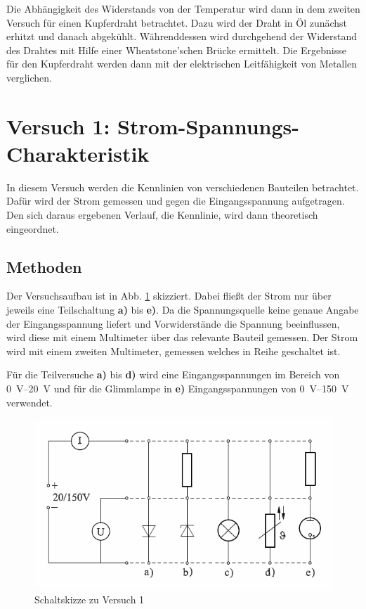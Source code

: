 \documentclass[11pt,a4paper,titlepage, ngerman]{article}
\begin{document}
		Die Abhängigkeit des Widerstands von der Temperatur wird dann in dem zweiten Versuch für einen Kupferdraht betrachtet.
		Dazu wird der Draht in Öl zunächst erhitzt und danach abgekühlt. Währenddessen wird durchgehend der Widerstand des Drahtes mit Hilfe einer Wheatstone'schen Brücke ermittelt. Die Ergebnisse für den Kupferdraht werden dann mit der elektrischen Leitfähigkeit von Metallen verglichen.

	\section{Versuch 1: Strom-Spannungs-Charakteristik}
		
		In diesem Versuch werden die Kennlinien von verschiedenen Bauteilen betrachtet. Dafür wird der Strom gemessen und gegen die Eingangsspannung aufgetragen. Den sich daraus ergebenen Verlauf, die Kennlinie, wird dann theoretisch eingeordnet. 
		
		\subsection{Methoden} 
		
		Der Versuchsaufbau ist in Abb. \ref{Schaltskizze1} skizziert. Dabei fließt der Strom nur über jeweils eine Teilschaltung \textbf{a)} bis \textbf{e)}. 
		Da die Spannungsquelle keine genaue Angabe der Eingangsspannung liefert und Vorwiderstände die Spannung beeinflussen, wird diese mit einem Multimeter über das relevante Bauteil gemessen.
		Der Strom wird mit einem zweiten Multimeter, gemessen welches in Reihe geschaltet ist.
		
		Für die Teilversuche \textbf{a)} bis \textbf{d)} wird eine Eingangsspannungen im Bereich von \SIrange{0}{20}{\V} und für die Glimmlampe in \textbf{e)} Eingangsspannungen von \SIrange{0}{150}{\V} verwendet.
		
		\begin{figure}
			\includegraphics[width=\textwidth]{Versuch1.png}
			\caption{Schaltskizze zu Versuch 1}
			\label{Schaltskizze1}
		\end{figure}
\end{document}
